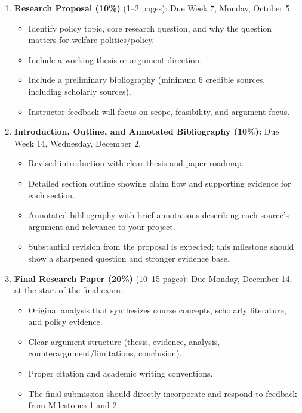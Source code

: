 \documentclass[12pt]{article}
\begin{document}
\begin{enumerate}
    \item \textbf{Research Proposal (10\%)} (1--2 pages): Due Week 7, Monday, October 5.
    \begin{itemize}
        \item Identify policy topic, core research question, and why the question matters for welfare politics/policy.
        \item Include a working thesis or argument direction.
        \item Include a preliminary bibliography (minimum 6 credible sources, including scholarly sources).
        \item Instructor feedback will focus on scope, feasibility, and argument focus.
    \end{itemize}
    \item \textbf{Introduction, Outline, and Annotated Bibliography (10\%):} Due Week 14, Wednesday, December 2.
    \begin{itemize}
        \item Revised introduction with clear thesis and paper roadmap.
        \item Detailed section outline showing claim flow and supporting evidence for each section.
        \item Annotated bibliography with brief annotations describing each source's argument and relevance to your project.
        \item Substantial revision from the proposal is expected; this milestone should show a sharpened question and stronger evidence base.
    \end{itemize}
    \item \textbf{Final Research Paper (20\%)} (10--15 pages): Due Monday, December 14, at the start of the final exam.
    \begin{itemize}
        \item Original analysis that synthesizes course concepts, scholarly literature, and policy evidence.
        \item Clear argument structure (thesis, evidence, analysis, counterargument/limitations, conclusion).
        \item Proper citation and academic writing conventions.
        \item The final submission should directly incorporate and respond to feedback from Milestones 1 and 2.
    \end{itemize}
\end{enumerate}
\end{document}
